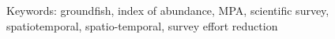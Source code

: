 \documentclass[12pt]{article}
\begin{document}

\noindent

Keywords:
groundfish,
index of abundance,
MPA,
scientific survey,
spatiotemporal,
spatio-temporal,
survey effort reduction





\end{document}
